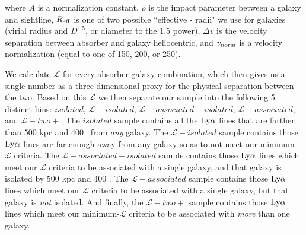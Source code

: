 \noindent where $A$ is a normalization constant, $\rho$ is the impact parameter between a galaxy and sightline, $R_{\rm eff}$ is one of two possible ``effective - radii" we use for galaxies (virial radius and $D^{1.5}$, or diameter to the 1.5 power), $\Delta v$ is the velocity separation between absorber and galaxy heliocentric, and $v_{\rm norm}$ is a velocity normalization (equal to one of 150, 200, or 250). 

We calculate $\mathcal{L}$ for every absorber-galaxy combination, which then gives us a single number as a three-dimensional proxy for the physical separation between the two. Based on this $\mathcal{L}$ we then separate our sample into the following 5 distinct bins: $isolated$, $\mathcal{L}-isolated$, $\mathcal{L}-associated-isolated$, $\mathcal{L}-associated$, and $\mathcal{L}-two+$. The $isolated$ sample contains all the $\rm Ly\alpha$ lines that are farther than 500 kpc and 400 \kms~from \emph{any} galaxy. The $\mathcal{L}-isolated$ sample contains those $\rm Ly\alpha$ lines are far enough away from any galaxy so as to not meet our minimum-$\mathcal{L}$ criteria. The $\mathcal{L}-associated-isolated$ sample contains those $\rm Ly\alpha$ lines which meet our $\mathcal{L}$ criteria to be associated with a single galaxy, and that galaxy is isolated by 500 kpc and 400 \kms. The $\mathcal{L}-associated$ sample contains those $\rm Ly\alpha$ lines which meet our $\mathcal{L}$ criteria to be associated with a single galaxy, but that galaxy is \emph{not} isolated. And finally, the $\mathcal{L}-two+$ sample contains those  $\rm Ly\alpha$ lines which meet our minimum-$\mathcal{L}$ criteria to be associated with \emph{more} than one galaxy.

